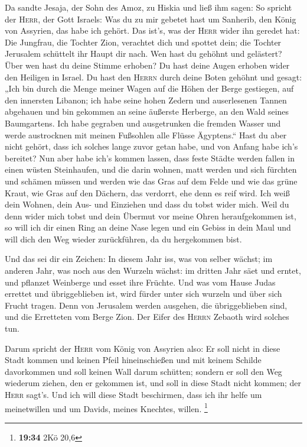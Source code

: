  Da sandte Jesaja, der Sohn des Amoz, zu Hiskia und ließ
ihm sagen: So spricht der \textsc{Herr}, der Gott Israels: Was du zu mir
gebetet hast um Sanherib, den König von Assyrien, das habe ich gehört.
 Das ist's, was der \textsc{Herr} wider ihn geredet hat:
Die Jungfrau, die Tochter Zion, verachtet dich und spottet dein; die
Tochter Jerusalem schüttelt ihr Haupt dir nach.  Wen hast
du gehöhnt und gelästert? Über wen hast du deine Stimme erhoben? Du hast
deine Augen erhoben wider den Heiligen in Israel.  Du
hast den \textsc{Herrn} durch deine Boten gehöhnt und gesagt: „Ich bin
durch die Menge meiner Wagen auf die Höhen der Berge gestiegen, auf den
innersten Libanon; ich habe seine hohen Zedern und auserlesenen Tannen
abgehauen und bin gekommen an seine äußerste Herberge, an den Wald
seines Baumgartens.  Ich habe gegraben und ausgetrunken
die fremden Wasser und werde austrocknen mit meinen Fußsohlen alle
Flüsse Ägyptens.``  Hast du aber nicht gehört, dass ich
solches lange zuvor getan habe, und von Anfang habe ich's bereitet? Nun
aber habe ich's kommen lassen, dass feste Städte werden fallen in einen
wüsten Steinhaufen,  und die darin wohnen, matt werden
und sich fürchten und schämen müssen und werden wie das Gras auf dem
Felde und wie das grüne Kraut, wie Gras auf den Dächern, das verdorrt,
ehe denn es reif wird.  Ich weiß dein Wohnen, dein Aus-
und Einziehen und dass du tobst wider mich.  Weil du denn
wider mich tobst und dein Übermut vor meine Ohren heraufgekommen ist, so
will ich dir einen Ring an deine Nase legen und ein Gebiss in dein Maul
und will dich den Weg wieder zurückführen, da du hergekommen bist.

 Und das sei dir ein Zeichen: In diesem Jahr iss, was von
selber wächst; im anderen Jahr, was noch aus den Wurzeln wächst: im
dritten Jahr säet und erntet, und pflanzet Weinberge und esset ihre
Früchte.  Und was vom Hause Judas errettet und
übriggeblieben ist, wird fürder unter sich wurzeln und über sich Frucht
tragen.  Denn von Jerusalem werden ausgehen, die
übriggeblieben sind, und die Erretteten vom Berge Zion. Der Eifer des
\textsc{Herrn} Zebaoth wird solches tun.

 Darum spricht der \textsc{Herr} vom König von Assyrien
also: Er soll nicht in diese Stadt kommen und keinen Pfeil
hineinschießen und mit keinem Schilde davorkommen und soll keinen Wall
darum schütten;  sondern er soll den Weg wiederum ziehen,
den er gekommen ist, und soll in diese Stadt nicht kommen; der
\textsc{Herr} sagt's.  Und ich will diese Stadt
beschirmen, dass ich ihr helfe um meinetwillen und um Davids, meines
Knechtes, willen. \footnote{\textbf{19:34} 2Kö 20,6}

